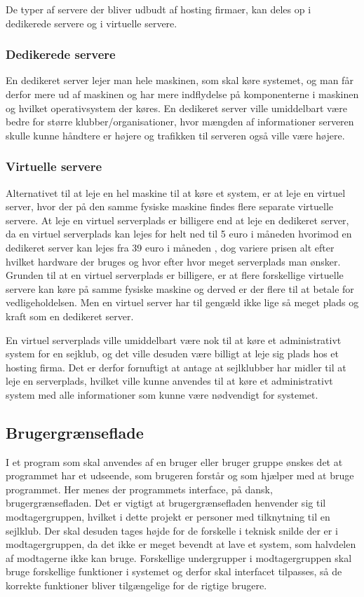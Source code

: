 De typer af servere der bliver udbudt af hosting firmaer, kan deles op i dedikerede servere og i virtuelle servere.
\subsubsection*{Dedikerede servere}
En dedikeret server lejer man hele maskinen, som skal køre systemet, og man får derfor mere ud af maskinen og har mere indflydelse på komponenterne i maskinen og hvilket operativsystem der køres.
En dedikeret server ville umiddelbart være bedre for større klubber/organisationer, hvor mængden af informationer serveren skulle kunne håndtere er højere og trafikken til serveren også ville være højere. \citep{server}
\subsubsection*{Virtuelle servere}
Alternativet til at leje en hel maskine til at køre et system, er at leje en virtuel server, hvor der på den samme fysiske maskine findes flere separate virtuelle servere. At leje en virtuel serverplads er billigere end at leje en dedikeret server, da en virtuel serverplads kan lejes for helt ned til 5 euro i måneden\citep{Virtuelserver} hvorimod en dedikeret server kan lejes fra 39 euro i måneden \citep{Dedikeretserver}, dog variere prisen alt efter hvilket hardware der bruges og hvor efter hvor meget serverplads man ønsker. 
Grunden til at en virtuel serverplads er billigere, er at flere forskellige virtuelle servere kan køre på samme fysiske maskine og derved er der flere til at betale for vedligeholdelsen. 
Men en virtuel server har til gengæld ikke lige så meget plads og kraft som en dedikeret server.\citep{server} 

En virtuel serverplads ville umiddelbart være nok til at køre et administrativt system for en sejklub, og det ville desuden være billigt at leje sig plads hos et hosting firma. 
Det er derfor fornuftigt at antage at sejlklubber har midler til at leje en serverplads, hvilket ville kunne anvendes til at køre et administrativt system med alle informationer som kunne være nødvendigt for systemet. 
\subsection*{Brugergrænseflade}
I et program som skal anvendes af en bruger eller bruger gruppe ønskes det at programmet har et udseende, som brugeren forstår og som hjælper med at bruge programmet.
Her menes der programmets interface, på dansk, brugergrænsefladen.
Det er vigtigt at brugergrænsefladen henvender sig til modtagergruppen, hvilket i dette projekt er personer med tilknytning til en sejlklub.
Der skal desuden tages højde for de forskelle i teknisk snilde der er i modtagergruppen, da det ikke er meget bevendt at lave et system, som halvdelen af modtagerne ikke kan bruge.
Forskellige undergrupper i modtagergruppen skal bruge forskellige funktioner i systemet og derfor skal interfacet tilpasses, så de korrekte funktioner bliver tilgængelige for de rigtige brugere.

